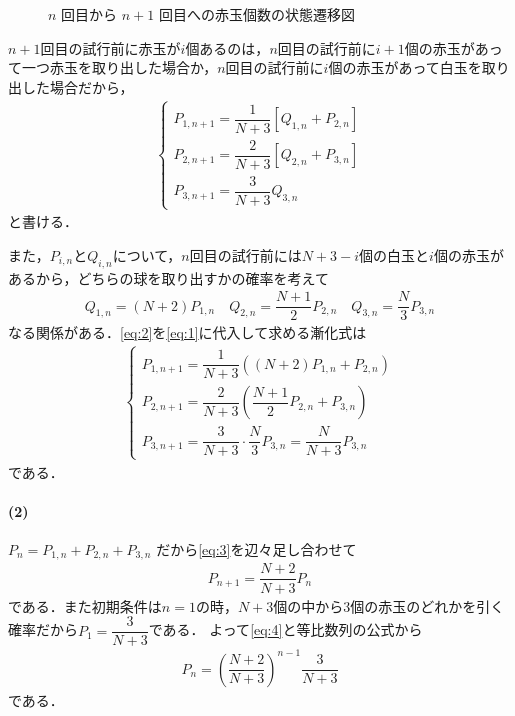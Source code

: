 \documentclass[../../main.tex]{subfiles}
\begin{document}
\begin{figure}[htb]
  \caption{$n$ 回目から $n+1$ 回目への赤玉個数の状態遷移図}
  \label{fig:state_transition}
\end{figure}

$n+1$回目の試行前に赤玉が$i$個あるのは，$n$回目の試行前に$i+1$個の赤玉があって一つ赤玉を取り出した場合か，$n$回目の試行前に$i$個の赤玉があって白玉を取り出した場合だから，
\begin{align}
  \begin{cases}
    P_{1,n+1} = \dfrac{1}{N+3}\left[ Q_{1,n} + P_{2,n}\right] \\
    P_{2,n+1} = \dfrac{2}{N+3}\left[ Q_{2,n} + P_{3,n}\right] \\
    P_{3,n+1} = \dfrac{3}{N+3} Q_{3,n}
  \end{cases} \label{eq:1}
\end{align}
と書ける．

また，$P_{i,n}$と$Q_{i,n}$について，$n$回目の試行前には$N+3-i$個の白玉と$i$個の赤玉があるから，どちらの球を取り出すかの確率を考えて
\begin{align}
  Q_{1,n} = (N+2)P_{1,n} \quad Q_{2,n} = \dfrac{N+1}{2} P_{2,n} \quad Q_{3,n} = \dfrac{N}{3} P_{3,n} \label{eq:2}
\end{align}
なる関係がある．\cref{eq:2}を\cref{eq:1}に代入して求める漸化式は
\begin{align}
  \begin{cases}
    P_{1,n+1} = \dfrac{1}{N+3} ( (N+2) P_{1,n} + P_{2,n} ) \\
    P_{2,n+1} = \dfrac{2}{N+3} ( \dfrac{N+1}{2} P_{2,n} + P_{3,n} ) \\
    P_{3,n+1} = \dfrac{3}{N+3} \cdot \dfrac{N}{3} P_{3,n} = \dfrac{N}{N+3} P_{3,n}
  \end{cases} \label{eq:3}
\end{align}
である．

\paragraph{(2)}

$P_n = P_{1,n} + P_{2,n} + P_{3,n}$ だから\cref{eq:3}を辺々足し合わせて
\begin{align}
  P_{n+1} = \dfrac{N+2}{N+3} P_n \label{eq:4}
\end{align}
である．また初期条件は$n=1$の時，$N+3$個の中から$3$個の赤玉のどれかを引く確率だから$P_1=\dfrac{3}{N+3}$である．
よって\cref{eq:4}と等比数列の公式から
\begin{align}
  P_n = \left(\dfrac{N+2}{N+3}\right)^{n-1} \dfrac{3}{N+3}
\end{align}
である．
\end{document}
